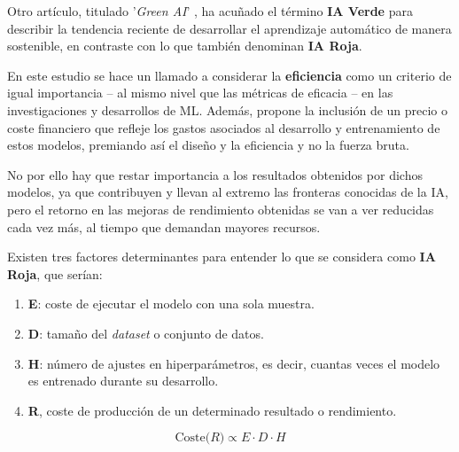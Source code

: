 \documentclass[00-Trabajo_Final.tex]{subfiles}
\begin{document}
Otro artículo, titulado '\textit{Green AI}' \cite{green_red_ai}, ha acuñado el término \textbf{IA Verde} para describir la tendencia reciente de desarrollar el aprendizaje automático de manera sostenible, en contraste con lo que también denominan \textbf{IA Roja}.

En este estudio se hace un llamado a considerar la \textbf{eficiencia} como un criterio de igual importancia{ }--{ }al mismo nivel que las métricas de eficacia{ }--{ }en las investigaciones y desarrollos de ML. Además, propone la inclusión de un precio o coste financiero que refleje los gastos asociados al desarrollo y entrenamiento de estos modelos, premiando así el diseño y la eficiencia y no la fuerza bruta.

No por ello hay que restar importancia a los resultados obtenidos por dichos modelos, ya que contribuyen y llevan al extremo las fronteras conocidas de la IA, pero el retorno en las mejoras de rendimiento obtenidas se van a ver reducidas cada vez más, al tiempo que demandan mayores recursos.

\vspace{0.5em}

Existen tres factores determinantes para entender lo que se considera como \textbf{IA Roja}, que serían:
\begin{enumerate}[noitemsep]
    \item \textbf{E}: coste de ejecutar el modelo con una sola muestra.
    \item \textbf{D}: tamaño del \textit{dataset} o conjunto de datos.
    \item \textbf{H}: número de ajustes en hiperparámetros, es decir, cuantas veces el modelo es entrenado durante su desarrollo.
    \item[] \textbf{R}, coste de producción de un determinado resultado o rendimiento.
\end{enumerate}
\begin{equation}
    \text{Coste(}R\text{)} \propto E \cdot D \cdot H
\end{equation}
\end{document}
